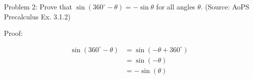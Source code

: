 Problem 2: Prove that $\sin(360^\circ - \theta) = -\sin \theta$ for all angles $\theta$. (Source: AoPS Precalculus Ex. 3.1.2)

Proof:

\begin{align*}
\sin(360^\circ - \theta) &= \sin(-\theta + 360^\circ) \\
&= \sin(-\theta) \\
&= \boxed{-\sin(\theta)}
\end{align*}
